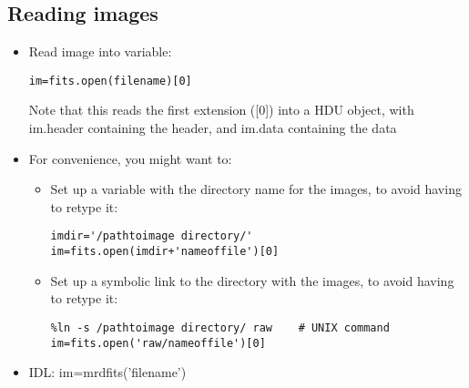 \documentclass[12pt]{article}
\begin{document}
\subsection*{Reading images}
\begin{itemize}
\item Read image into variable:
\begin{verbatim}
im=fits.open(filename)[0]
\end{verbatim}
Note that this reads the first extension ([0]) into a HDU object, with
im.header containing the header, and im.data containing the data
\item For convenience, you might want to:
\begin{itemize}
\item Set up a variable with the directory name for the images,
to avoid having to retype it:
\begin{verbatim}
imdir='/pathtoimage directory/'
im=fits.open(imdir+'nameoffile')[0]
\end{verbatim}
\item Set up a symbolic link to the directory with the images,
to avoid having to retype it:
\begin{verbatim}
%ln -s /pathtoimage directory/ raw    # UNIX command
im=fits.open('raw/nameoffile')[0]
\end{verbatim}
\end{itemize}
\item IDL: im=mrdfits('filename')
\end{itemize}
\end{document}
